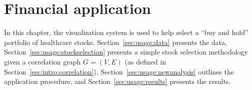 
\chapter{Financial application \label{ch:usage}}

In this chapter, the visualization system is used to help select a ``buy and 
hold'' portfolio of healthcare stocks. 
Section~\ref{sec:usage:data} presents the data, 
Section~\ref{sec:usage:stockselection} presents a simple stock selection 
methodology given a correlation graph $G=(V,E)$ (as defined in 
Section~\ref{sec:intro:correlation}), 
Section~\ref{sec:usage:newanalysis} outlines the application 
procedure, and Section~\ref{sec:usage:results} presents the results.



%



